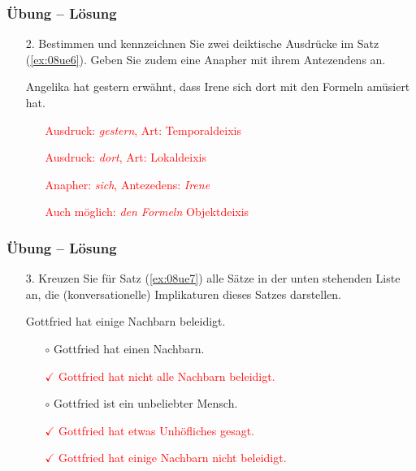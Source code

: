 \begin{frame}
	\frametitle{Übung -- Lösung}
	
	\begin{enumerate}
		\item[2.] Bestimmen und kennzeichnen Sie zwei deiktische Ausdrücke im Satz (\ref{ex:08ue6}). Geben Sie zudem eine Anapher mit ihrem Antezendens an.
	
	\begin{exe}
		 Angelika hat gestern erwähnt, dass Irene sich dort mit den Formeln amüsiert hat.
	\end{exe}
		
		\begin{itemize}
			\item[] \textcolor{red}{Ausdruck: \emph{gestern}, Art: Temporaldeixis}
			\item[] \textcolor{red}{Ausdruck: \emph{dort}, Art: Lokaldeixis}
			\item[] \textcolor{red}{Anapher: \emph{sich}, Antezedens: \emph{Irene}}
			\item[] \textcolor{red}{Auch möglich: \emph{den Formeln} \ras Objektdeixis}
		\end{itemize}
		
	\end{enumerate}
	
\end{frame}


\begin{frame}
	\frametitle{Übung -- Lösung}
	
	\begin{enumerate}
		\item[3.] Kreuzen Sie für Satz (\ref{ex:08ue7}) alle Sätze in der unten stehenden Liste an, die (konversationelle) Implikaturen dieses Satzes darstellen.
		
	\begin{exe}
		 Gottfried hat einige Nachbarn beleidigt.
	\end{exe}

		\begin{itemize}
			\item[$\circ$] Gottfried hat einen Nachbarn.
			\item[\textcolor{red}{$\checkmark$}] \textcolor{red}{Gottfried hat nicht alle Nachbarn beleidigt.}
			\item[$\circ$] Gottfried ist ein unbeliebter Mensch.
			\item[\textcolor{red}{$\checkmark$}] \textcolor{red}{Gottfried hat etwas Unhöfliches gesagt.}
			\item[\textcolor{red}{$\checkmark$}] \textcolor{red}{Gottfried hat einige Nachbarn nicht beleidigt.}
		\end{itemize}
		
	\end{enumerate}


\end{frame}